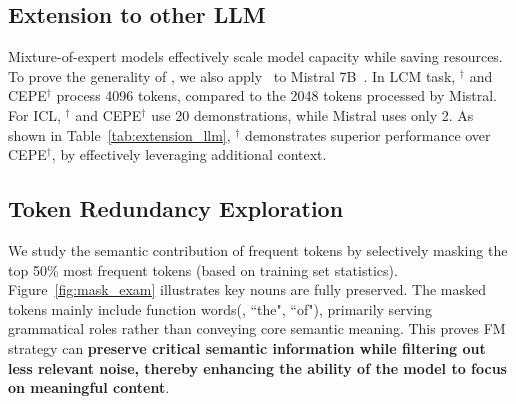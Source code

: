 
\subsection{Extension to other LLM}
Mixture-of-expert models effectively scale model capacity while saving resources.
To prove the generality of \ourname, we also apply \ourname\ to Mistral 7B~\cite{jiang2023mistral}. 
In LCM task, \ourname$^{\dagger}$ and CEPE$^{\dagger}$ process 4096 tokens,  compared to the 2048 tokens processed by Mistral. 
For ICL, \ourname$^{\dagger}$ and CEPE$^{\dagger}$ use 20 demonstrations, while Mistral uses only 2. 
As shown in Table~\ref{tab:extension_llm}, \ourname$^{\dagger}$ demonstrates superior performance over CEPE$^{\dagger}$, by effectively leveraging additional context.



\subsection{Token Redundancy Exploration}
We study the semantic contribution of frequent tokens by selectively masking the top 50\% most frequent tokens (based on training set statistics).
Figure~\ref{fig:mask_exam} illustrates key nouns are fully preserved. 
The masked tokens mainly include function words(\eg, ``the", ``of"), primarily serving grammatical roles rather than conveying core semantic meaning. 
This proves FM strategy can
\textbf{preserve critical semantic information while filtering out less relevant noise, thereby enhancing the ability of the model to focus on meaningful content}.
